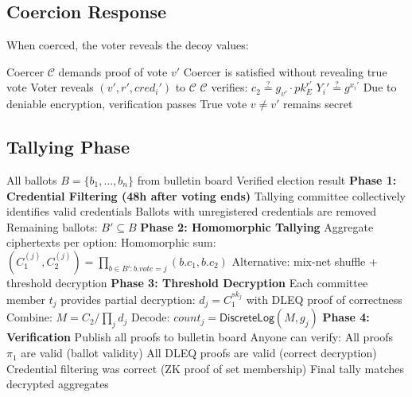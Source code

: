 \documentclass[11pt,a4paper]{article}
\newcommand{\CC}{\mathcal{C}}
\begin{document}
\subsection{Coercion Response}

When coerced, the voter reveals the decoy values:

\begin{algorithm}[H]
\caption{Coercion Response Protocol}
\label{alg:coerce-response}
\begin{algorithmic}[1]
\Require Coercer $\CC$ demands proof of vote $v'$
\Ensure Coercer is satisfied without revealing true vote
\State Voter reveals $(v', r', \mathit{cred}_i')$ to $\CC$
\State $\CC$ verifies:
\State \quad $c_2 \stackrel{?}{=} g_{v'} \cdot pk_E^{r'}$ 
\State \quad $Y_i' \stackrel{?}{=} g^{x_i'}$ 
\State Due to deniable encryption, verification passes
\State True vote $v \neq v'$ remains secret
\end{algorithmic}
\end{algorithm}

\subsection{Tallying Phase}

\begin{algorithm}[H]
\caption{Decentralized Tallying}
\label{alg:tally}
\begin{algorithmic}[1]
\Require All ballots $B = \{b_1, \ldots, b_n\}$ from bulletin board
\Ensure Verified election result
\Statex \textbf{Phase 1: Credential Filtering (48h after voting ends)}
\State Tallying committee collectively identifies valid credentials
\State Ballots with unregistered credentials are removed
\State Remaining ballots: $B' \subseteq B$
\Statex \textbf{Phase 2: Homomorphic Tallying}
\State Aggregate ciphertexts per option:
    \State Homomorphic sum: $(C_1^{(j)}, C_2^{(j)}) = \prod_{b \in B': b.\mathit{vote}=j} (b.c_1, b.c_2)$
\EndFor
\State Alternative: mix-net shuffle + threshold decryption
\Statex \textbf{Phase 3: Threshold Decryption}
\State Each committee member $t_j$ provides partial decryption:
\State \quad $d_j = C_1^{sk_j}$ with DLEQ proof of correctness
\State Combine: $M = C_2 / \prod_j d_j$
\State Decode: $\mathit{count}_j = \mathsf{DiscreteLog}(M, g_j)$ 
\Statex \textbf{Phase 4: Verification}
\State Publish all proofs to bulletin board
\State Anyone can verify:
\State \quad All proofs $\pi_1$ are valid (ballot validity)
\State \quad All DLEQ proofs are valid (correct decryption)
\State \quad Credential filtering was correct (ZK proof of set membership)
\State \quad Final tally matches decrypted aggregates
\end{algorithmic}
\end{algorithm}
\end{document}
